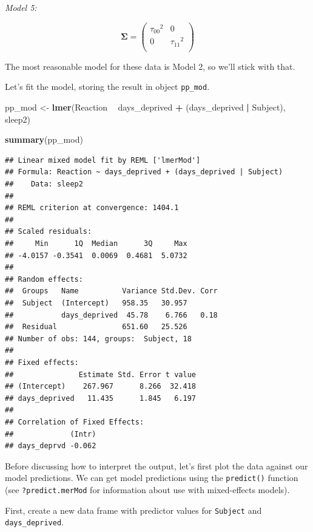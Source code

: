 \documentclass[]{book}
\newenvironment{Shaded}{\begin{snugshade}}{\end{snugshade}}
\newcommand{\KeywordTok}[1]{\textcolor[rgb]{0.13,0.29,0.53}{\textbf{#1}}}
\newcommand{\NormalTok}[1]{#1}
\newcommand{\OperatorTok}[1]{\textcolor[rgb]{0.81,0.36,0.00}{\textbf{#1}}}
\newcommand{\StringTok}[1]{\textcolor[rgb]{0.31,0.60,0.02}{#1}}
\begin{document}
\emph{Model 5:}

\begin{equation*}
  \mathbf{\Sigma} = \left(
  \begin{array}{cc}
    {\tau_{00}}^2 &             0 \\
                0 & {\tau_{11}}^2 \\
  \end{array}\right) 
\end{equation*}

The most reasonable model for these data is Model 2, so we'll stick with that.

Let's fit the model, storing the result in object \texttt{pp\_mod}.

\begin{Shaded}
\begin{Highlighting}[]
\NormalTok{pp_mod <-}\StringTok{ }\KeywordTok{lmer}\NormalTok{(Reaction }\OperatorTok{~}\StringTok{ }\NormalTok{days_deprived }\OperatorTok{+}\StringTok{ }\NormalTok{(days_deprived }\OperatorTok{|}\StringTok{ }\NormalTok{Subject), sleep2)}

\KeywordTok{summary}\NormalTok{(pp_mod)}
\end{Highlighting}
\end{Shaded}

\begin{verbatim}
## Linear mixed model fit by REML ['lmerMod']
## Formula: Reaction ~ days_deprived + (days_deprived | Subject)
##    Data: sleep2
## 
## REML criterion at convergence: 1404.1
## 
## Scaled residuals: 
##     Min      1Q  Median      3Q     Max 
## -4.0157 -0.3541  0.0069  0.4681  5.0732 
## 
## Random effects:
##  Groups   Name          Variance Std.Dev. Corr
##  Subject  (Intercept)   958.35   30.957       
##           days_deprived  45.78    6.766   0.18
##  Residual               651.60   25.526       
## Number of obs: 144, groups:  Subject, 18
## 
## Fixed effects:
##               Estimate Std. Error t value
## (Intercept)    267.967      8.266  32.418
## days_deprived   11.435      1.845   6.197
## 
## Correlation of Fixed Effects:
##             (Intr)
## days_deprvd -0.062
\end{verbatim}

Before discussing how to interpret the output, let's first plot the data against our model predictions. We can get model predictions using the \texttt{predict()} function (see \texttt{?predict.merMod} for information about use with mixed-effects models).

First, create a new data frame with predictor values for \texttt{Subject} and \texttt{days\_deprived}.
\end{document}

